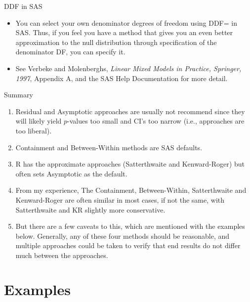 \documentclass[
  9pt,
  ignorenonframetext,
]{beamer}
\begin{document}
\begin{frame}{DDF in SAS}
\protect\hypertarget{ddf-in-sas}{}
\begin{itemize}
\item
  You can select your own denominator degrees of freedom using DDF= in
  SAS. Thus, if you feel you have a method that gives you an even better
  approximation to the null distribution through specification of the
  denominator DF, you can specify it.
\item
  See Verbeke and Molenberghs, \emph{Linear Mixed Models in Practice,
  Springer, 1997}, Appendix A, and the SAS Help Documentation for more
  detail.
\end{itemize}
\end{frame}

\begin{frame}{Summary}
\protect\hypertarget{summary}{}
\begin{enumerate}
\item
  Residual and Asymptotic approaches are usually not recommend since
  they will likely yield \(p\)-values too small and CI's too narrow
  (i.e., approaches are too liberal).
\item
  Containment and Between-Within methods are SAS defaults.
\item
  R has the approximate approaches (Satterthwaite and Kenward-Roger) but
  often sets Asymptotic as the default.
\item
  From my experience, The Containment, Between-Within, Satterthwaite and
  Kenward-Roger are often similar in most cases, if not the same, with
  Satterthwaite and KR slightly more conservative.
\item
  But there are a few caveats to this, which are mentioned with the
  examples below. Generally, any of these four methods should be
  reasonable, and multiple approaches could be taken to verify that end
  results do not differ much between the approaches.
\end{enumerate}
\end{frame}

\hypertarget{examples}{%
\section{Examples}\label{examples}}
\end{document}
